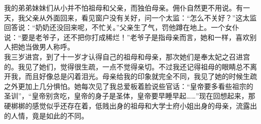 我的弟弟妹妹们从小并不怕祖母和父亲，而独伯母亲。佣仆自然更不用说。有一天，我父亲从外面回来，看见窗户没有关好，问一个太监：“怎么不关好？”这太监回答说：“奶奶还没回来呢，不忙关。”父亲生了气，罚他蹲在地上。一个女仆说：“要是老爷子，还不把你打成稀烂！”老爷子是指母亲而言，她和一样，喜欢别人把她当做男人称呼。\\

我三岁进宫，到了十一岁才认得自己的祖母和母亲，那次她们是奉太妃之召进宫的。我见了她们，觉得很生疏，一点不觉得亲切。不过我还记得祖母的眼睛总不离开我，而且好像总是闪着泪光。母亲给我的印象就完全不同，我见了她的时候生疏之外更加上几分惧怕。她每次见了我总爱板着脸说些官话：“皇帝要多看些祖宗的圣训”，“皇帝别贪吃，皇帝的身子是圣体，皇帝要早睡早起……”现在回想起来，那硬梆梆的感觉似乎还存在着，低贱出身的祖母和大学士府小姐出身的母亲，流露出的人情，竟是如此的不同。
